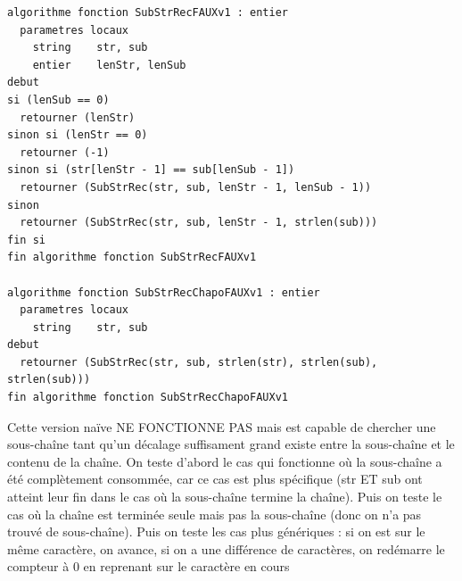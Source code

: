 \documentclass[11pt,a4paper]{article}
\begin{document}
\begin{table}[ht!]
  \centering
\begin{lstlisting}[style=algorithmique]
algorithme fonction SubStrRecFAUXv1 : entier
  parametres locaux
    string    str, sub
    entier    lenStr, lenSub
debut
si (lenSub == 0)
  retourner (lenStr)
sinon si (lenStr == 0)
  retourner (-1)
sinon si (str[lenStr - 1] == sub[lenSub - 1])
  retourner (SubStrRec(str, sub, lenStr - 1, lenSub - 1))
sinon
  retourner (SubStrRec(str, sub, lenStr - 1, strlen(sub)))
fin si
fin algorithme fonction SubStrRecFAUXv1

algorithme fonction SubStrRecChapoFAUXv1 : entier
  parametres locaux
    string    str, sub
debut
  retourner (SubStrRec(str, sub, strlen(str), strlen(sub), strlen(sub)))
fin algorithme fonction SubStrRecChapoFAUXv1 \end{lstlisting}
  \caption{Cette version naïve NE FONCTIONNE PAS mais est capable de chercher une sous-chaîne tant qu'un décalage suffisament grand existe entre la sous-chaîne et le contenu de la chaîne. On teste d'abord le cas qui fonctionne où la sous-chaîne a été complètement consommée, car ce cas est plus spécifique (str ET sub ont atteint leur fin dans le cas où la sous-chaîne termine la chaîne). Puis on teste le cas où la chaîne est terminée seule mais pas la sous-chaîne (donc on n'a pas trouvé de sous-chaîne). Puis on teste les cas plus génériques : si on est sur le même caractère, on avance, si on a une différence de caractères, on redémarre le compteur à 0 en reprenant sur le caractère en cours}
\end{table}


\vfillLast

\clearpage

\vfillFirst
\end{document}
